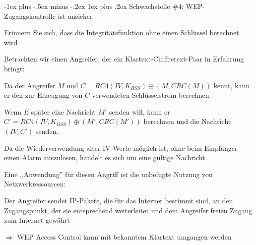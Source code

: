 \documentclass[a4paper]{article}
\makeatletter
\renewcommand{\subsubsection}{\@startsection{subsubsection}{3}{0mm}%
 {-1ex plus -.5ex minus -.2ex}%
 {1ex plus .2ex}%
 {\normalfont\small\bfseries}}
\makeatother
\begin{document}
\begin{multicols}{3}
      \subsubsection{Schwachstelle \#4: WEP-Zugangskontrolle ist unsicher}
      \begin{itemize*}
            \item Erinnern Sie sich, dass die Integritätsfunktion ohne einen Schlüssel berechnet wird
            \item Betrachten wir einen Angreifer, der ein Klartext-Chiffretext-Paar in Erfahrung bringt:
            \begin{itemize*}
                  \item Da der Angreifer $M$ und $C=RC4(IV, K_{BSS})\oplus (M, CRC(M))$ kennt, kann er den zur Erzeugung von $C$ verwendeten Schlüsselstrom berechnen
                  \item Wenn $E$ später eine Nachricht $M'$ senden will, kann er $C' = RC4(IV, K_{BSS})\oplus (M', CRC(M'))$ berechnen und die Nachricht $(IV, C')$ senden.
                  \item Da die Wiederverwendung alter IV-Werte möglich ist, ohne beim Empfänger einen Alarm auszulösen, handelt es sich um eine gültige Nachricht
                  \item Eine ,,Anwendung'' für diesen Angriff ist die unbefugte Nutzung von Netzwerkressourcen:
                  \begin{itemize*}
                        \item Der Angreifer sendet IP-Pakete, die für das Internet bestimmt sind, an den Zugangspunkt, der sie entsprechend weiterleitet und dem Angreifer freien Zugang zum Internet gewährt
                  \end{itemize*}
            \end{itemize*}
            \item $\Rightarrow$ WEP Access Control kann mit bekanntem Klartext umgangen werden
      \end{itemize*}


\end{multicols}
\end{document}
